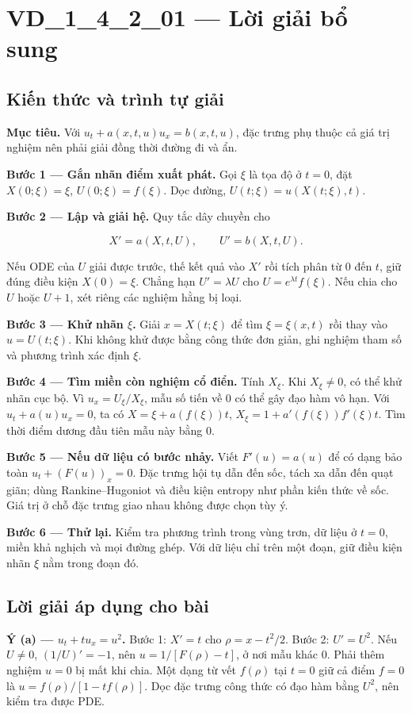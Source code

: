 \documentclass[10pt,a4paper]{article}
\begin{document}
\section*{VD\_1\_4\_2\_01 — Lời giải bổ sung}
\subsection*{Kiến thức và trình tự giải}
\textbf{Mục tiêu.} Với $u_t+a(x,t,u)u_x=b(x,t,u)$, đặc trưng phụ thuộc cả giá trị nghiệm nên phải giải đồng thời đường đi và ẩn.

\textbf{Bước 1 — Gắn nhãn điểm xuất phát.} Gọi $\xi$ là tọa độ ở $t=0$, đặt $X(0;\xi)=\xi$, $U(0;\xi)=f(\xi)$. Dọc đường, $U(t;\xi)=u(X(t;\xi),t)$.

\textbf{Bước 2 — Lập và giải hệ.} Quy tắc dây chuyền cho

\[
X'=a(X,t,U),\qquad U'=b(X,t,U).
\]

Nếu ODE của $U$ giải được trước, thế kết quả vào $X'$ rồi tích phân từ 0 đến $t$, giữ đúng điều kiện $X(0)=\xi$. Chẳng hạn $U'=\lambda U$ cho $U=e^{\lambda t}f(\xi)$. Nếu chia cho $U$ hoặc $U+1$, xét riêng các nghiệm hằng bị loại.

\textbf{Bước 3 — Khử nhãn $\xi$.} Giải $x=X(t;\xi)$ để tìm $\xi=\xi(x,t)$ rồi thay vào $u=U(t;\xi)$. Khi không khử được bằng công thức đơn giản, ghi nghiệm tham số và phương trình xác định $\xi$.

\textbf{Bước 4 — Tìm miền còn nghiệm cổ điển.} Tính $X_\xi$. Khi $X_\xi\ne0$, có thể khử nhãn cục bộ. Vì $u_x=U_\xi/X_\xi$, mẫu số tiến về 0 có thể gây đạo hàm vô hạn. Với $u_t+a(u)u_x=0$, ta có $X=\xi+a(f(\xi))t$, $X_\xi=1+a'(f(\xi))f'(\xi)t$. Tìm thời điểm dương đầu tiên mẫu này bằng 0.

\textbf{Bước 5 — Nếu dữ liệu có bước nhảy.} Viết $F'(u)=a(u)$ để có dạng bảo toàn $u_t+(F(u))_x=0$. Đặc trưng hội tụ dẫn đến sốc, tách xa dẫn đến quạt giãn; dùng Rankine–Hugoniot và điều kiện entropy như phần kiến thức về sốc. Giá trị ở chỗ đặc trưng giao nhau không được chọn tùy ý.

\textbf{Bước 6 — Thử lại.} Kiểm tra phương trình trong vùng trơn, dữ liệu ở $t=0$, miền khả nghịch và mọi đường ghép. Với dữ liệu chỉ trên một đoạn, giữ điều kiện nhãn $\xi$ nằm trong đoạn đó.
\subsection*{Lời giải áp dụng cho bài}
\textbf{Ý (a) — $u_t+tu_x=u^2$.} Bước 1: $X'=t$ cho $\rho=x-t^2/2$. Bước 2: $U'=U^2$. Nếu $U\ne0$, $(1/U)'=-1$, nên $u=1/[F(\rho)-t]$, ở nơi mẫu khác 0. Phải thêm nghiệm $u=0$ bị mất khi chia. Một dạng từ vết $f(\rho)$ tại $t=0$ giữ cả điểm $f=0$ là $u=f(\rho)/[1-tf(\rho)]$. Dọc đặc trưng công thức có đạo hàm bằng $U^2$, nên kiểm tra được PDE.
\end{document}
